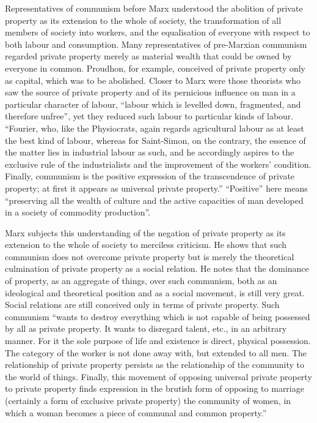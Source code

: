 \documentclass[12pt,a4paper,openany]{book}
\begin{document}
Representatives of communism before Marx understood the abolition of private property as its extension to the whole of society, the transformation of all members of society into workers, and the equalisation of everyone with respect to both labour and consumption. Many representatives of pre-Marxian communism regarded private property merely as material wealth that could be owned by everyone in common. Proudhon, for example, conceived of private property only as capital, which was to be abolished. Closer to Marx were those theorists who saw the source of private property and of its pernicious influence on man in a particular character of labour, “labour which is levelled down, fragmented, and therefore unfree”, yet they reduced such labour to particular kinds of labour. “Fourier, who, like the Physiocrats, again regards agricultural labour as at least the best kind of labour, whereas for Saint-Simon, on the contrary, the essence of the matter lies in industrial labour as such, and he accordingly aspires to the exclusive rule of the industrialists and the improvement of the workers’ condition. Finally, communism is the positive expression of the transcendence of private property; at first it appears as universal private property.” “Positive” here means “preserving all the wealth of culture and the active capacities of man developed in a society of commodity production”.

Marx subjects this understanding of the negation of private property as its extension to the whole of society to merciless criticism. He shows that such communism does not overcome private property but is merely the theoretical culmination of private property as a social relation. He notes that the dominance of property, as an aggregate of things, over such communism, both as an ideological and theoretical position and as a social movement, is still very great. Social relations are still conceived only in terms of private property. Such communism “wants to destroy everything which is not capable of being possessed by all as private property. It wants to disregard talent, etc., in an arbitrary manner. For it the sole purpose of life and existence is direct, physical possession. The category of the worker is not done away with, but extended to all men. The relationship of private property persists as the relationship of the community to the world of things. Finally, this movement of opposing universal private property to private property finds expression in the brutish form of opposing to marriage (certainly a form of exclusive private property) the community of women, in which a woman becomes a piece of communal and common property.”
\end{document}
